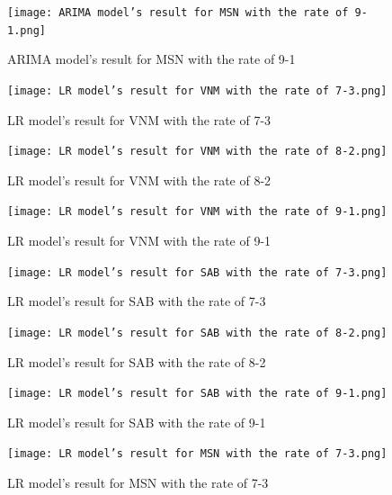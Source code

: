 \documentclass{ieeeojies}
\begin{document}
   \begin{figure}[H]
    \centering
    \begin{minipage}{0.23\textwidth}
    \centering
    \texttt{[image: ARIMA model’s result for MSN with the rate of 9-1.png]}
    \caption{ARIMA model’s result for MSN with the rate of 9-1}
    \end{minipage}
    \hfill
    \begin{minipage}{0.23\textwidth}
    \centering
    \texttt{[image: LR model’s result for VNM with the rate of 7-3.png]}
    \caption{LR model’s result for VNM with the rate of 7-3}
    \end{minipage}
    \end{figure}
    \begin{figure}[H]
    \begin{minipage}{0.23\textwidth}
    \centering
    \texttt{[image: LR model’s result for VNM with the rate of 8-2.png]}
    \caption{LR model’s result for VNM with the rate of 8-2}
    \end{minipage}
    \hfill
    \begin{minipage}{0.23\textwidth}
    \centering
    \texttt{[image: LR model’s result for VNM with the rate of 9-1.png]}
    \caption{LR model’s result for VNM with the rate of 9-1}
    \end{minipage}
   \end{figure}
   
   \begin{figure}[H]
    \centering
    \begin{minipage}{0.23\textwidth}
    \centering
    \texttt{[image: LR model’s result for SAB with the rate of 7-3.png]}
    \caption{LR model’s result for SAB with the rate of 7-3}
    \end{minipage}
    \hfill
    \begin{minipage}{0.23\textwidth}
    \centering
    \texttt{[image: LR model’s result for SAB with the rate of 8-2.png]}
    \caption{LR model’s result for SAB with the rate of 8-2}
    \end{minipage}
    \end{figure}
    
    \begin{figure}[H]
    \begin{minipage}{0.23\textwidth}
    \centering
    \texttt{[image: LR model’s result for SAB with the rate of 9-1.png]}
    \caption{LR model’s result for SAB with the rate of 9-1}
    \end{minipage}
    \hfill
    \begin{minipage}{0.23\textwidth}
    \centering
    \texttt{[image: LR model’s result for MSN with the rate of 7-3.png]}
    \caption{LR model’s result for MSN with the rate of 7-3}
    \end{minipage}
   \end{figure}
\end{document}
